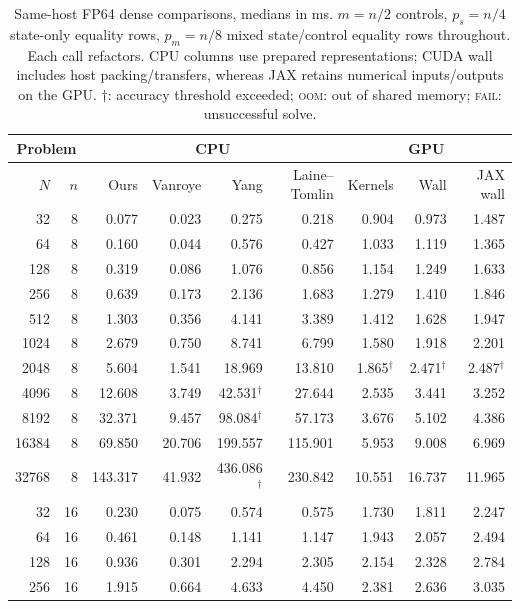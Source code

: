 \begin{table}[!t]
\centering\footnotesize\setlength{\tabcolsep}{3pt}
\caption{Same-host FP64 dense comparisons, medians in ms. $m=n/2$ controls, $p_s=n/4$ state-only equality rows, $p_m=n/8$ mixed state/control equality rows throughout. Each call refactors. CPU columns use prepared representations; CUDA wall includes host packing/transfers, whereas JAX retains numerical inputs/outputs on the GPU. $\dagger$: accuracy threshold exceeded; \textsc{oom}: out of shared memory; \textsc{fail}: unsuccessful solve.}
\label{tab:dense-comparisons}
\begin{tabular}{|r|r|r|r|r|r|r|r|r|}\hline
\multicolumn{2}{|c|}{Problem} & \multicolumn{4}{c|}{CPU} & \multicolumn{3}{c|}{GPU} \\\hline
$N$ & $n$ & Ours & Vanroye & Yang & Laine--Tomlin & Kernels & Wall & JAX wall \\\hline
32 & 8 & 0.077 & 0.023 & 0.275 & 0.218 & 0.904 & 0.973 & 1.487 \\
64 & 8 & 0.160 & 0.044 & 0.576 & 0.427 & 1.033 & 1.119 & 1.365 \\
128 & 8 & 0.319 & 0.086 & 1.076 & 0.856 & 1.154 & 1.249 & 1.633 \\
256 & 8 & 0.639 & 0.173 & 2.136 & 1.683 & 1.279 & 1.410 & 1.846 \\
512 & 8 & 1.303 & 0.356 & 4.141 & 3.389 & 1.412 & 1.628 & 1.947 \\
1024 & 8 & 2.679 & 0.750 & 8.741 & 6.799 & 1.580 & 1.918 & 2.201 \\
2048 & 8 & 5.604 & 1.541 & 18.969 & 13.810 & 1.865$^{\dagger}$ & 2.471$^{\dagger}$ & 2.487$^{\dagger}$ \\
4096 & 8 & 12.608 & 3.749 & 42.531$^{\dagger}$ & 27.644 & 2.535 & 3.441 & 3.252 \\
8192 & 8 & 32.371 & 9.457 & 98.084$^{\dagger}$ & 57.173 & 3.676 & 5.102 & 4.386 \\
16384 & 8 & 69.850 & 20.706 & 199.557 & 115.901 & 5.953 & 9.008 & 6.969 \\
32768 & 8 & 143.317 & 41.932 & 436.086$^{\dagger}$ & 230.842 & 10.551 & 16.737 & 11.965 \\
\hline
32 & 16 & 0.230 & 0.075 & 0.574 & 0.575 & 1.730 & 1.811 & 2.247 \\
64 & 16 & 0.461 & 0.148 & 1.141 & 1.147 & 1.943 & 2.057 & 2.494 \\
128 & 16 & 0.936 & 0.301 & 2.294 & 2.305 & 2.154 & 2.328 & 2.784 \\
256 & 16 & 1.915 & 0.664 & 4.633 & 4.450 & 2.381 & 2.636 & 3.035 \\

\end{tabular}
\end{table}
